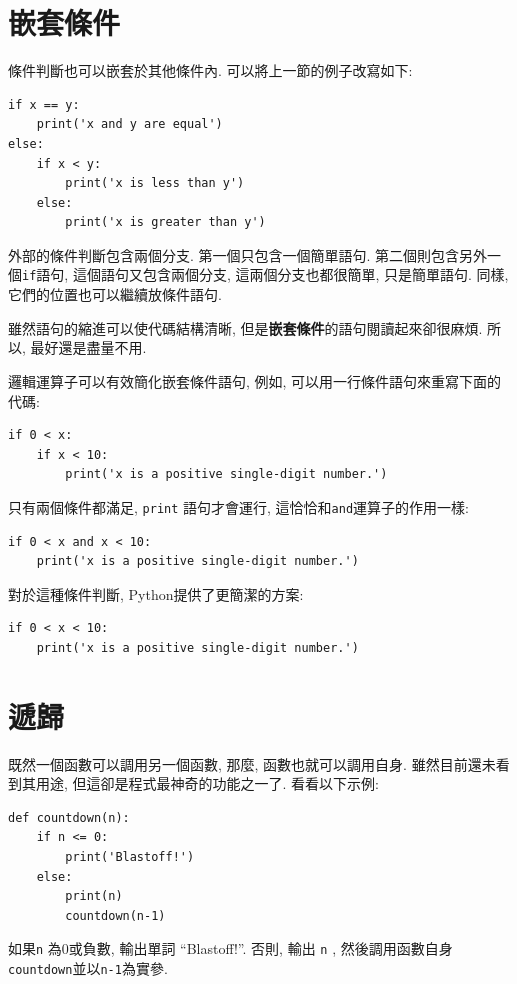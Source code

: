 \documentclass[10pt]{book}
\begin{document}
\section{嵌套條件}

條件判斷也可以嵌套於其他條件內. 
可以將上一節的例子改寫如下:

\begin{verbatim}
if x == y:
    print('x and y are equal')
else:
    if x < y:
        print('x is less than y')
    else:
        print('x is greater than y')
\end{verbatim}
%
外部的條件判斷包含兩個分支. 
第一個只包含一個簡單語句. 
第二個則包含另外一個{\tt if}語句, 
這個語句又包含兩個分支, 這兩個分支也都很簡單, 只是簡單語句. 
同樣, 它們的位置也可以繼續放條件語句.

雖然語句的縮進可以使代碼結構清晰, 但是{\bf 嵌套條件}的語句閱讀起來卻很麻煩. 
所以, 最好還是盡量不用. 

邏輯運算子可以有效簡化嵌套條件語句, 例如, 可以用一行條件語句來重寫下面的代碼:

\begin{verbatim}
if 0 < x:
    if x < 10:
        print('x is a positive single-digit number.')
\end{verbatim}
%
只有兩個條件都滿足, {\tt print} 語句才會運行, 這恰恰和{\tt and}運算子的作用一樣:

\begin{verbatim}
if 0 < x and x < 10:
    print('x is a positive single-digit number.')
\end{verbatim}

對於這種條件判斷, Python提供了更簡潔的方案:

\begin{verbatim}
if 0 < x < 10:
    print('x is a positive single-digit number.')
\end{verbatim}


\section{遞歸}
\label{recursion}

既然一個函數可以調用另一個函數, 那麼, 函數也就可以調用自身. 
雖然目前還未看到其用途, 但這卻是程式最神奇的功能之一了. 
看看以下示例:

\begin{verbatim}
def countdown(n):
    if n <= 0:
        print('Blastoff!')
    else:
        print(n)
        countdown(n-1)
\end{verbatim}
%
如果{\tt n} 為0或負數, 輸出單詞 ``Blastoff!''. 
否則, 輸出{ \tt n} , 然後調用函數自身{\tt countdown}並以{\tt n-1}為實參. 
\end{document}
